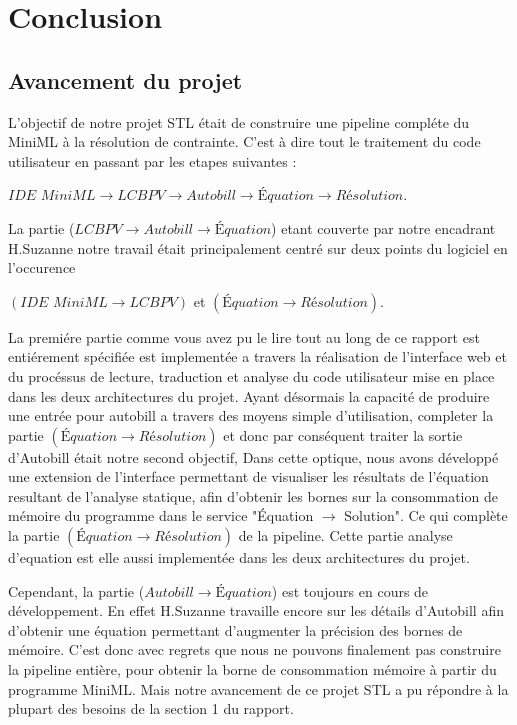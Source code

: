 \documentclass[12pt]{article}
\begin{document}
\pagebreak

\hypertarget{conclusion}{%
      \section{Conclusion}\label{conclusion}}
\hypertarget{conclusion}{%
      \subsection{Avancement du projet}\label{Avancement du Projet}}

L'objectif de notre projet STL était de construire une pipeline compléte du MiniML à la résolution de contrainte.
C'est à dire tout le traitement du code utilisateur en passant par les etapes suivantes :
\begin{center}
\quad\quad$ \textit{IDE MiniML} \rightarrow \textit{LCBPV} \rightarrow Autobill \rightarrow Équation \rightarrow Résolution$.
\end{center}
La partie ($\textit{LCBPV} \rightarrow Autobill \rightarrow Équation$) etant couverte par notre encadrant H.Suzanne notre travail était principalement centré sur deux points du logiciel en l'occurence
\begin{center}
      $(\textit{IDE MiniML} \rightarrow \textit{LCBPV})$ et $(Équation \rightarrow Résolution)$.
\end{center}
La premiére partie comme vous avez pu le lire tout au long de ce rapport est entiérement spécifiée est implementée a travers la réalisation de l'interface web et du procéssus de lecture, traduction et analyse du code utilisateur mise en place dans les deux architectures du projet.
Ayant désormais la capacité de produire une entrée pour autobill a travers des moyens simple d'utilisation, completer la partie $(Équation \rightarrow Résolution)$ et donc par conséquent traiter la sortie d'Autobill était notre second objectif,
Dans cette optique, nous avons développé une extension de l'interface permettant de visualiser les résultats de l'équation resultant de l'analyse statique, afin d'obtenir les bornes sur la consommation de mémoire du programme dans le service "Équation $\rightarrow$ Solution".
Ce qui complète la partie $(Équation \rightarrow Résolution)$ de la pipeline. Cette partie analyse d'equation est elle aussi implementée dans les deux architectures du projet.

Cependant, la partie ($Autobill \rightarrow Équation$) est toujours en cours de développement.
En effet H.Suzanne travaille encore sur les détails d'Autobill afin d'obtenir une équation permettant d'augmenter la précision des bornes de mémoire.
C'est donc avec regrets que nous ne pouvons finalement pas construire la pipeline entière, pour obtenir la borne de consommation mémoire à partir du programme MiniML.
Mais notre avancement de ce projet STL a pu répondre à la plupart des besoins de la section 1 du rapport.
\end{document}
